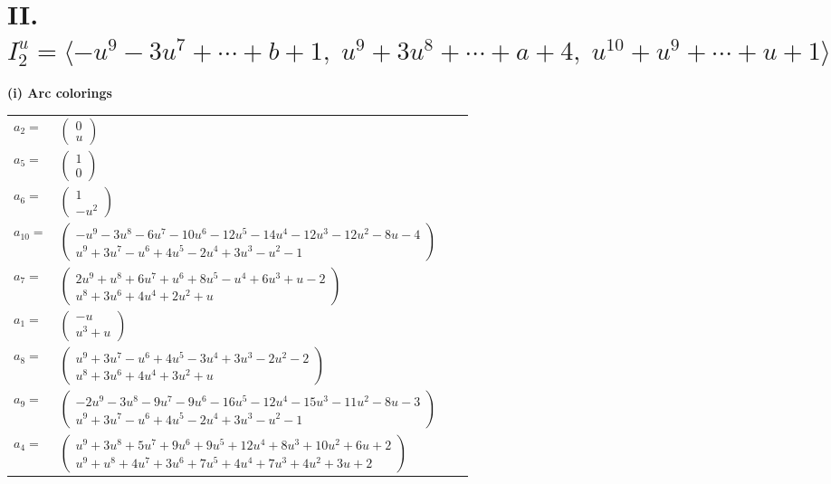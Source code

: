 \documentclass[1p]{elsarticle_modified}
\theoremstyle{definition}
\begin{document}
\centering \section*{II. $I^u_{2}= \langle - u^9-3 u^7+\cdots+b+1,\;u^9+3 u^8+\cdots+a+4,\;u^{10}+u^9+\cdots+u+1 \rangle$}
\flushleft \textbf{(i) Arc colorings}\\
\begin{tabular}{m{7pt} m{180pt} m{7pt} m{180pt} }
\flushright $a_{2}=$&$\begin{pmatrix}0\\u\end{pmatrix}$ \\
\flushright $a_{5}=$&$\begin{pmatrix}1\\0\end{pmatrix}$ \\
\flushright $a_{6}=$&$\begin{pmatrix}1\\- u^2\end{pmatrix}$ \\
\flushright $a_{10}=$&$\begin{pmatrix}- u^9-3 u^8-6 u^7-10 u^6-12 u^5-14 u^4-12 u^3-12 u^2-8 u-4\\u^9+3 u^7- u^6+4 u^5-2 u^4+3 u^3- u^2-1\end{pmatrix}$ \\
\flushright $a_{7}=$&$\begin{pmatrix}2 u^9+u^8+6 u^7+u^6+8 u^5- u^4+6 u^3+u-2\\u^8+3 u^6+4 u^4+2 u^2+u\end{pmatrix}$ \\
\flushright $a_{1}=$&$\begin{pmatrix}- u\\u^3+u\end{pmatrix}$ \\
\flushright $a_{8}=$&$\begin{pmatrix}u^9+3 u^7- u^6+4 u^5-3 u^4+3 u^3-2 u^2-2\\u^8+3 u^6+4 u^4+3 u^2+u\end{pmatrix}$ \\
\flushright $a_{9}=$&$\begin{pmatrix}-2 u^9-3 u^8-9 u^7-9 u^6-16 u^5-12 u^4-15 u^3-11 u^2-8 u-3\\u^9+3 u^7- u^6+4 u^5-2 u^4+3 u^3- u^2-1\end{pmatrix}$ \\
\flushright $a_{4}=$&$\begin{pmatrix}u^9+3 u^8+5 u^7+9 u^6+9 u^5+12 u^4+8 u^3+10 u^2+6 u+2\\u^9+u^8+4 u^7+3 u^6+7 u^5+4 u^4+7 u^3+4 u^2+3 u+2\end{pmatrix}$ \\

\end{tabular}
\end{document}
